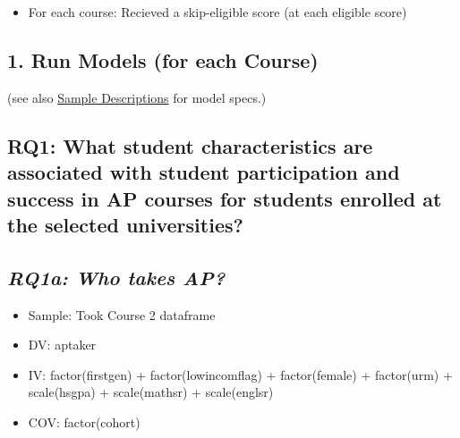 \documentclass[]{article}
\newenvironment{Shaded}{\begin{snugshade}}{\end{snugshade}}
\newcommand{\KeywordTok}[1]{\textcolor[rgb]{0.13,0.29,0.53}{\textbf{#1}}}
\newcommand{\DecValTok}[1]{\textcolor[rgb]{0.00,0.00,0.81}{#1}}
\newcommand{\StringTok}[1]{\textcolor[rgb]{0.31,0.60,0.02}{#1}}
\newcommand{\CommentTok}[1]{\textcolor[rgb]{0.56,0.35,0.01}{\textit{#1}}}
\newcommand{\OperatorTok}[1]{\textcolor[rgb]{0.81,0.36,0.00}{\textbf{#1}}}
\newcommand{\NormalTok}[1]{#1}
\providecommand{\tightlist}{%
  \setlength{\itemsep}{0pt}\setlength{\parskip}{0pt}}
\begin{document}
\begin{itemize}
\tightlist
\item
  For each course: Recieved a skip-eligible score (at each eligible
  score)
\end{itemize}

\begin{Shaded}
\end{Shaded}

\subsection{1. Run Models (for each
Course)}\label{run-models-for-each-course}

(see also
\href{https://docs.google.com/spreadsheets/d/1rN8W_iz1mr7lEzBGfdTZHa45wKOSLiSF8VEpChCPsmE/edit\#gid=129222174}{Sample
Descriptions} for model specs.)

\subsection{RQ1: What student characteristics are associated with
student participation and success in AP courses for students enrolled at
the selected
universities?}\label{rq1-what-student-characteristics-are-associated-with-student-participation-and-success-in-ap-courses-for-students-enrolled-at-the-selected-universities}

\subsection{\texorpdfstring{\emph{RQ1a: Who takes
AP?}}{RQ1a: Who takes AP?}}\label{rq1a-who-takes-ap}

\begin{itemize}
\tightlist
\item
  Sample: Took Course 2 dataframe
\item
  DV: aptaker
\item
  IV: factor(firstgen) + factor(lowincomflag) + factor(female) +
  factor(urm) + scale(hsgpa) + scale(mathsr) + scale(englsr)
\item
  COV: factor(cohort)
\end{itemize}
\end{document}
